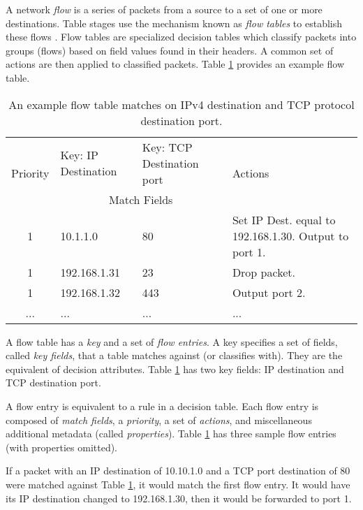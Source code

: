 A network \emph{flow} is a series of packets from a source to a set of one or
more destinations.
Table stages use the mechanism known as \emph{flow tables} to establish these
flows \cite{openflow_spec}. 
Flow tables are specialized decision tables which classify packets into
groups (flows) based on field values found in their headers. 
A common set of actions are then applied to classified packets.
Table \ref{tbl:flow_table} provides an example flow table.

\begin{table}[ht]
\caption{An example flow table matches on IPv4 destination and TCP protocol
destination port.}
\label{tbl:flow_table}
\centering
\begin{tabularx}{\linewidth}{| c | X | X | X |}
\hline
\multirow{2}{*}{Priority} & Key: IP Destination & Key: TCP Destination port  &
\multirow{2}{*}{Actions} \\
\cline{2-3}
  & \multicolumn{2}{|c|}{Match Fields} & \\
\hline
\hline
1 & 10.1.1.0 & 80 & Set IP Dest. equal to 192.168.1.30. Output to port 1. \\
\hline
1 & 192.168.1.31 & 23 & Drop packet. \\
\hline
1 & 192.168.1.32 & 443 & Output port 2. \\
\hline
... & ... & ... & ... \\
\hline
\end{tabularx}
\end{table}


A flow table has a \emph{key} and a set of \emph{flow entries}. A
key specifies a set of fields, called \emph{key fields}, that a table matches
against (or classifies with). They are the equivalent of decision attributes.
Table \ref{tbl:flow_table} has two key fields: IP destination and TCP
destination port.

A flow entry is equivalent to a rule in a decision table. Each flow entry is
composed of \emph{match fields}, a \emph{priority}, a set of
\emph{actions}, and miscellaneous additional metadata (called
\emph{properties}). Table \ref{tbl:flow_table} has three sample flow entries
(with properties omitted).

If a packet with an IP destination of 10.10.1.0 and a TCP port
destination of 80 were matched against Table \ref{tbl:flow_table}, it would
match the first flow entry. It would have its IP destination changed to
192.168.1.30, then it would be forwarded to port 1.

